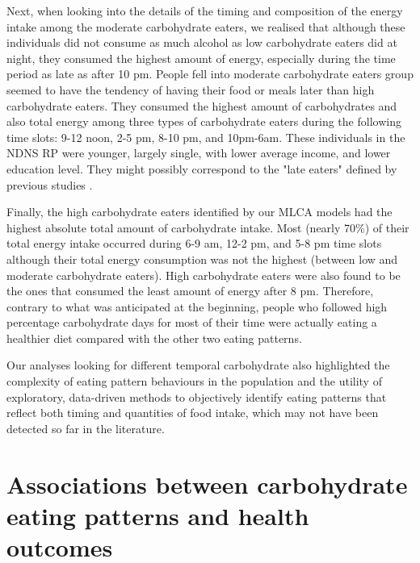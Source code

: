 Next, when looking into the details of the timing and composition of the energy intake among the moderate carbohydrate eaters, we realised that although these individuals did not consume as much alcohol as low carbohydrate eaters did at night, they consumed the highest amount of energy, especially during the time period as late as after 10 pm. People fell into moderate carbohydrate eaters group seemed to have the tendency of having their food or meals later than high carbohydrate eaters. They consumed the highest amount of carbohydrates and also total energy among three types of carbohydrate eaters during the following time slots: 9-12 noon, 2-5 pm, 8-10 pm, and 10pm-6am. These individuals in the NDNS RP were younger, largely single, with lower average income, and lower education level. They might possibly correspond to the "late eaters" defined by previous studies \parencite{leech2017temporal, mansukhani2018investigating}. 

Finally, the high carbohydrate eaters identified by our MLCA models had the highest absolute total amount of carbohydrate intake. Most (nearly 70\%) of their total energy intake occurred during 6-9 am, 12-2 pm, and 5-8 pm time slots although their total energy consumption was not the highest (between low and moderate carbohydrate eaters). High carbohydrate eaters were also found to be the ones that consumed the least amount of energy after 8 pm. Therefore, contrary to what was anticipated at the beginning, people who followed high percentage carbohydrate days for most of their time were actually eating a healthier diet compared with the other two eating patterns. 

Our analyses looking for different temporal carbohydrate also highlighted the complexity of eating pattern behaviours in the population and the utility of exploratory, data-driven methods to objectively identify eating patterns that reflect both timing and quantities of food intake, which may not have been detected so far in the literature.


\section{Associations between carbohydrate eating patterns and health outcomes}

